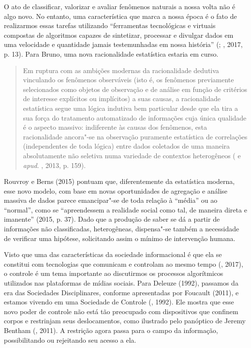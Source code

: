 O ato de classificar, valorizar e avaliar fenômenos naturais a nossa
volta não é algo novo. No entanto, uma característica que marca a nossa
época é o fato de realizarmos essas tarefas utilizando ``ferramentas
tecnológicas e virtuais compostas de algoritmos capazes de sintetizar,
processar e divulgar dados em uma velocidade e quantidade jamais
testemunhadas em nossa história'' (; , 2017, p. 13). Para Bruno, uma nova racionalidade estatística estaria em curso.

\begin{quote}
Em ruptura com as ambições modernas da racionalidade dedutiva vinculando
os fenômenos observáveis (isto é, os fenômenos previamente selecionados
como objetos de observação e de análise em função de critérios de
interesse explícitos ou implícitos) a suas causas, a racionalidade
estatística segue uma lógica indutiva bem particular desde que ela tira
a sua força do tratamento automatizado de informações cuja única
qualidade é o aspecto massivo: indiferente às causas dos fenômenos, esta
racionalidade ancora"-se na observação puramente estatística de
correlações (independentes de toda lógica) entre dados coletados de uma
maneira absolutamente não seletiva numa variedade de contextos
heterogêneos ( e  \emph{apud}. , 2013, p. 159).
\end{quote}

Rouvroy e Berns (2015) pontuam que, diferentemente da estatística
moderna, esse novo modelo, com base em novas oportunidades de agregação
e análise massiva de dados parece emancipar"-se de toda relação à
``média'' ou ao ``normal'', como se ``apreendessem a realidade social
como tal, de maneira direta e imanente'' (2015, p. 37). Dado que a produção
de saber se dá a partir de informações não classificadas, heterogêneas,
dispensa"-se também a necessidade de verificar uma hipótese, solicitando
assim o mínimo de intervenção humana.

Visto que uma das características da sociedade informacional é que ela
se constitui com tecnologias que comunicam e controlam ao mesmo tempo
(, 2017), o controle é um tema importante ao discutirmos os
processos algorítmicos utilizados nas plataformas de mídias sociais.
Para Deleuze (1992), passamos da era das Sociedades Disciplinares,
conforme apresentadas por Foucault (2011), e estamos vivendo em uma Sociedade de Controle (, 1992). Ele mostra que esse novo poder de controle não está tão
preocupado com dispositivos que confinem corpos e restrinjam seus
deslocamentos, como ilustrado pelo panóptico de Jeremy Bentham (, 2011).
A restrição agora passa para o campo da informação, possibilitando ou rejeitando seu acesso a ela.

